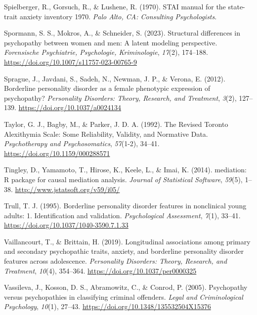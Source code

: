 \documentclass[
  man,floatsintext]{apa7}
\newlength{\cslhangindent}
\newlength{\cslentryspacingunit} %
\newenvironment{CSLReferences}[2] %
 {%
  \setlength{\parindent}{0pt}
  \ifodd #1
  \let\oldpar\par
  \def\par{\hangindent=\cslhangindent\oldpar}
  \fi
  \setlength{\parskip}{#2\cslentryspacingunit}
 }%
 {}
\begin{document}
\begin{CSLReferences}{1}{0}
\leavevmode{}%
Spielberger, R., Gorsuch, R., \& Lushene, R. (1970). STAI manual for the state-trait anxiety inventory 1970. \emph{Palo Alto, CA: Consulting Psychologists}.

\leavevmode{}%
Spormann, S. S., Mokros, A., \& Schneider, S. (2023). Structural differences in psychopathy between women and men: A latent modeling perspective. \emph{Forensische Psychiatrie, Psychologie, Kriminologie}, \emph{17}(2), 174--188. \url{https://doi.org/10.1007/s11757-023-00765-9}

\leavevmode{}%
Sprague, J., Javdani, S., Sadeh, N., Newman, J. P., \& Verona, E. (2012). Borderline personality disorder as a female phenotypic expression of psychopathy? \emph{Personality Disorders: Theory, Research, and Treatment}, \emph{3}(2), 127--139. \url{https://doi.org/10.1037/a0024134}

\leavevmode{}%
Taylor, G. J., Bagby, M., \& Parker, J. D. A. (1992). The {Revised Toronto Alexithymia Scale}: {Some Reliability}, {Validity}, and {Normative Data}. \emph{Psychotherapy and Psychosomatics}, \emph{57}(1-2), 34--41. \url{https://doi.org/10.1159/000288571}

\leavevmode{}%
Tingley, D., Yamamoto, T., Hirose, K., Keele, L., \& Imai, K. (2014). {mediation}: {R} package for causal mediation analysis. \emph{Journal of Statistical Software}, \emph{59}(5), 1--38. \url{http://www.jstatsoft.org/v59/i05/}

\leavevmode{}%
Trull, T. J. (1995). Borderline personality disorder features in nonclinical young adults: 1. {Identification} and validation. \emph{Psychological Assessment}, \emph{7}(1), 33--41. \url{https://doi.org/10.1037/1040-3590.7.1.33}

\leavevmode{}%
Vaillancourt, T., \& Brittain, H. (2019). Longitudinal associations among primary and secondary psychopathic traits, anxiety, and borderline personality disorder features across adolescence. \emph{Personality Disorders: Theory, Research, and Treatment}, \emph{10}(4), 354--364. \url{https://doi.org/10.1037/per0000325}

\leavevmode{}%
Vassileva, J., Kosson, D. S., Abramowitz, C., \& Conrod, P. (2005). Psychopathy versus psychopathies in classifying criminal offenders. \emph{Legal and Criminological Psychology}, \emph{10}(1), 27--43. \url{https://doi.org/10.1348/135532504X15376}


\end{CSLReferences}
\end{document}
